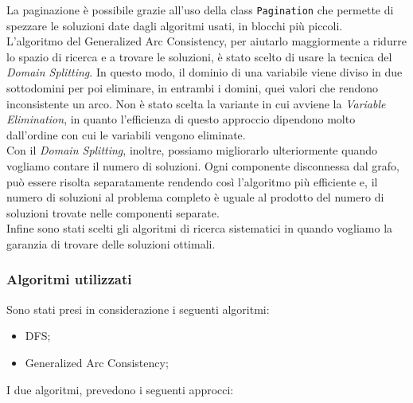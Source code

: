 \documentclass[12pt, letterpaper]{article}
\begin{document}
\noindent La paginazione è possibile grazie all'uso della class \texttt{Pagination} che permette
di spezzare le soluzioni date dagli algoritmi usati, in blocchi più piccoli. \\

\noindent L'algoritmo del Generalized Arc Consistency, per aiutarlo maggiormente a ridurre lo spazio
di ricerca e a trovare le soluzioni, è stato scelto di usare la tecnica del \textit{Domain Splitting}.
In questo modo, il dominio di una variabile viene diviso in due sottodomini per poi
eliminare, in entrambi i domini, quei valori che rendono inconsistente un arco. Non è stato scelta la
variante in cui avviene la \textit{Variable Elimination}, in quanto l'efficienza di questo
approccio dipendono molto dall'ordine con cui le variabili vengono eliminate. \\

\noindent Con il \textit{Domain Splitting}, inoltre, possiamo migliorarlo ulteriormente quando
vogliamo contare il numero di soluzioni. Ogni componente disconnessa dal grafo, può essere risolta
separatamente rendendo così l'algoritmo più efficiente e, il numero di soluzioni al problema completo è uguale
al prodotto del numero di soluzioni trovate nelle componenti separate. \\

\noindent Infine sono stati scelti gli algoritmi di ricerca sistematici in quando vogliamo la garanzia di
trovare delle soluzioni ottimali.

\subsubsection{Algoritmi utilizzati}

Sono stati presi in considerazione i seguenti algoritmi:

\begin{itemize}
      \item DFS;
      \item Generalized Arc Consistency;
\end{itemize}

\noindent I due algoritmi, prevedono i seguenti approcci: \\
\end{document}
